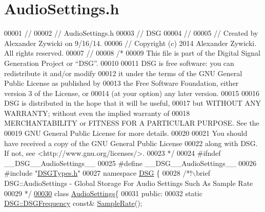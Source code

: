 \hypertarget{_audio_settings_8h_source}{\section{Audio\+Settings.\+h}
\label{_audio_settings_8h_source}
}

\begin{DoxyCode}
00001 \textcolor{comment}{//}
00002 \textcolor{comment}{//  AudioSettings.h}
00003 \textcolor{comment}{//  DSG}
00004 \textcolor{comment}{//}
00005 \textcolor{comment}{//  Created by Alexander Zywicki on 9/16/14.}
00006 \textcolor{comment}{//  Copyright (c) 2014 Alexander Zywicki. All rights reserved.}
00007 \textcolor{comment}{//}
00008 \textcolor{comment}{/*}
00009 \textcolor{comment}{ This file is part of the Digital Signal Generation Project or “DSG”.}
00010 \textcolor{comment}{}
00011 \textcolor{comment}{ DSG is free software: you can redistribute it and/or modify}
00012 \textcolor{comment}{ it under the terms of the GNU General Public License as published by}
00013 \textcolor{comment}{ the Free Software Foundation, either version 3 of the License, or}
00014 \textcolor{comment}{ (at your option) any later version.}
00015 \textcolor{comment}{}
00016 \textcolor{comment}{ DSG is distributed in the hope that it will be useful,}
00017 \textcolor{comment}{ but WITHOUT ANY WARRANTY; without even the implied warranty of}
00018 \textcolor{comment}{ MERCHANTABILITY or FITNESS FOR A PARTICULAR PURPOSE.  See the}
00019 \textcolor{comment}{ GNU General Public License for more details.}
00020 \textcolor{comment}{}
00021 \textcolor{comment}{ You should have received a copy of the GNU General Public License}
00022 \textcolor{comment}{ along with DSG.  If not, see <http://www.gnu.org/licenses/>.}
00023 \textcolor{comment}{ */}
00024 \textcolor{preprocessor}{#ifndef \_\_DSG\_\_AudioSettings\_\_}
00025 \textcolor{preprocessor}{#define \_\_DSG\_\_AudioSettings\_\_}
00026 \textcolor{preprocessor}{#include "\hyperlink{_d_s_g_types_8h}{DSGTypes.h}"}
00027 \textcolor{keyword}{namespace }\hyperlink{namespace_d_s_g}{DSG} \{\textcolor{comment}{}
00028 \textcolor{comment}{    /*!\(\backslash\)brief DSG::AudioSettings - Global Storage For Audio Settings Such As Sample Rate}
00029 \textcolor{comment}{     */}
\hypertarget{_audio_settings_8h_source_l00030}{}\hyperlink{class_d_s_g_1_1_audio_settings}{00030}     \textcolor{keyword}{class }\hyperlink{class_d_s_g_1_1_audio_settings}{AudioSettings}\{
00031     \textcolor{keyword}{public}:
00032         \textcolor{keyword}{static} \hyperlink{namespace_d_s_g_a4315a061386fa1014fda09b15d3a6973}{DSG::DSGFrequency} \textcolor{keyword}{const}& \hyperlink{class_d_s_g_1_1_audio_settings_a4f459c389b10c11828e2f2f00c012c49}{SampleRate}();

\end{DoxyCode}
